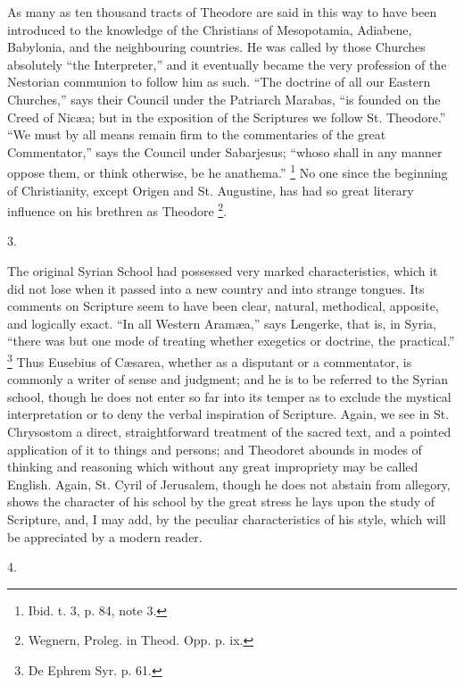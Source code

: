 As many as ten thousand tracts of Theodore are said in this way to
have been introduced to the knowledge of the Christians of
Mesopotamia, Adiabene, Babylonia, and the neighbouring countries. He
was called by those Churches absolutely ``the Interpreter,''
and it eventually became the very profession of the Nestorian
communion to follow him as such. ``The doctrine of all our Eastern
Churches,'' says their Council under the Patriarch Marabas,
``is
founded on the Creed of Nicæa; but in the exposition of the Scriptures
we follow St. Theodore.'' ``We must by all means remain firm
to the commentaries of the great Commentator,'' says the Council
under Sabarjesus; ``whoso shall in any manner oppose them, or
think otherwise, be he anathema.'' \footnote{Ibid. t. 3, p. 84, note 3.} No one since the beginning of Christianity, except Origen and
St. Augustine, has had so great literary influence on his brethren as
Theodore \footnote{Wegnern, Proleg. in Theod. Opp. p. ix.}.

3.

The original Syrian School had possessed very marked
characteristics, which it did not lose when it passed into a new
country and into strange tongues. Its comments on Scripture seem to
have been clear, natural, methodical, apposite, and logically exact.
``In all Western Aramæa,'' says Lengerke, that is, in Syria,
``there was but one mode of treating whether exegetics or
doctrine, the practical.'' \footnote{De Ephrem Syr. p. 61.} Thus Eusebius of Cæsarea, whether as a disputant or a
commentator, is commonly a writer of sense and judgment; and he is to
be referred to the Syrian school, though he does not enter so far into
its temper as to exclude the mystical interpretation or to deny the
verbal inspiration of Scripture. Again, we see in St. Chrysostom a
direct, straightforward treatment of the sacred text, and a pointed
application of it to things and persons; and Theodoret abounds in
modes of thinking and reasoning which without any great impropriety
may be called English. Again, St. Cyril of Jerusalem, though he does
not abstain from allegory, shows the character of his school by the
great stress he lays upon the study of Scripture, and, I may add, by
the peculiar characteristics of his style, which will be appreciated
by a modern reader.

4.

